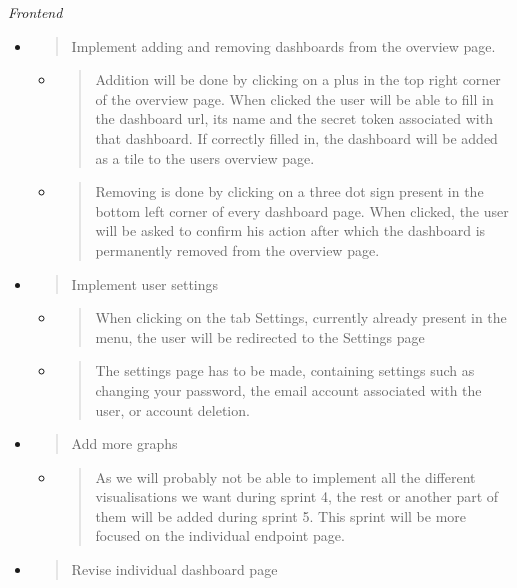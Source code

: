 \emph{Frontend}

\begin{itemize}
\item
  \begin{quote}
  Implement adding and removing dashboards from the overview page.
  \end{quote}

  \begin{itemize}
  \item
    \begin{quote}
    Addition will be done by clicking on a plus in the top right corner
    of the overview page. When clicked the user will be able to fill in
    the dashboard url, its name and the secret token associated with
    that dashboard. If correctly filled in, the dashboard will be added
    as a tile to the users overview page.
    \end{quote}
  \item
    \begin{quote}
    Removing is done by clicking on a three dot sign present in the
    bottom left corner of every dashboard page. When clicked, the user
    will be asked to confirm his action after which the dashboard is
    permanently removed from the overview page.
    \end{quote}
  \end{itemize}
\item
  \begin{quote}
  Implement user settings
  \end{quote}

  \begin{itemize}
  \item
    \begin{quote}
    When clicking on the tab Settings, currently already present in the
    menu, the user will be redirected to the Settings page
    \end{quote}
  \item
    \begin{quote}
    The settings page has to be made, containing settings such as
    changing your password, the email account associated with the user,
    or account deletion.
    \end{quote}
  \end{itemize}
\item
  \begin{quote}
  Add more graphs
  \end{quote}

  \begin{itemize}
  \item
    \begin{quote}
    As we will probably not be able to implement all the different
    visualisations we want during sprint 4, the rest or another part of
    them will be added during sprint 5. This sprint will be more focused
    on the individual endpoint page.
    \end{quote}
  \end{itemize}
\item
  \begin{quote}
  Revise individual dashboard page
  \end{quote}


\end{itemize}
